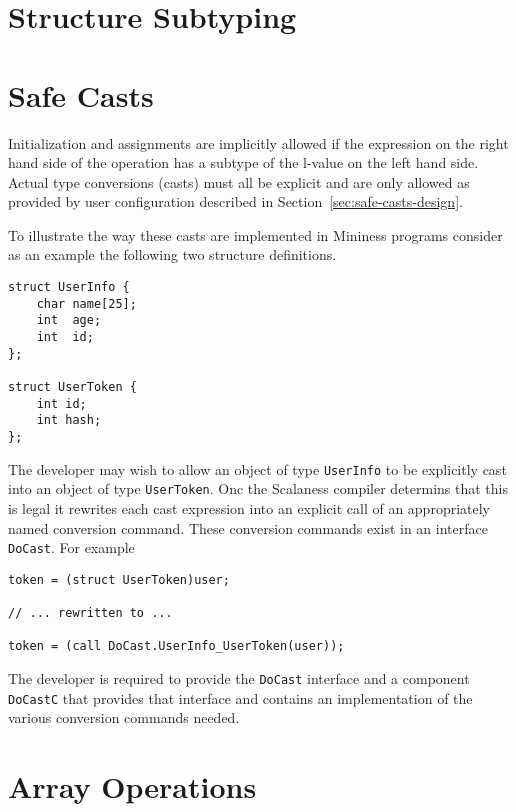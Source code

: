 \section{Structure Subtyping}
\label{sec:structure-subtyping-implementation}

\section{Safe Casts}
\label{sec:safe-casts-implementation}

Initialization and assignments are implicitly allowed if the expression on the right hand side
of the operation has a subtype of the l-value on the left hand side. Actual type conversions
(casts) must all be explicit and are only allowed as provided by user configuration described in
Section~\ref{sec:safe-casts-design}.

To illustrate the way these casts are implemented in Mininess programs consider as an example
the following two structure definitions.

\singlespace
\begin{lstlisting}[language=nesC]
struct UserInfo {
    char name[25];
    int  age;
    int  id;
};

struct UserToken {
    int id;
    int hash;
};
\end{lstlisting}
\primaryspacing

The developer may wish to allow an object of type \texttt{UserInfo} to be explicitly cast into
an object of type \texttt{UserToken}. Onc the Scalaness compiler determins that this is legal it
rewrites each cast expression into an explicit call of an appropriately named conversion
command. These conversion commands exist in an interface \texttt{DoCast}. For example

\singlespace
\begin{lstlisting}[language=nesC]
token = (struct UserToken)user;

// ... rewritten to ...

token = (call DoCast.UserInfo_UserToken(user));
\end{lstlisting}
\primaryspacing

The developer is required to provide the \texttt{DoCast} interface and a component
\texttt{DoCastC} that provides that interface and contains an implementation of the various
conversion commands needed.


\section{Array Operations}
\label{sec:array-operations-implementation}

